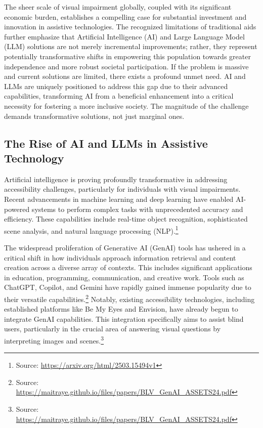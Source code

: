 The sheer scale of visual impairment globally, coupled with its significant economic burden, establishes a compelling case for substantial investment and innovation in assistive technologies. The recognized limitations of traditional aids further emphasize that Artificial Intelligence (AI) and Large Language Model (LLM) solutions are not merely incremental improvements; rather, they represent potentially transformative shifts in empowering this population towards greater independence and more robust societal participation. If the problem is massive and current solutions are limited, there exists a profound unmet need. AI and LLMs are uniquely positioned to address this gap due to their advanced capabilities, transforming AI from a beneficial enhancement into a critical necessity for fostering a more inclusive society. The magnitude of the challenge demands transformative solutions, not just marginal ones.

\subsection{The Rise of AI and LLMs in Assistive Technology}

Artificial intelligence is proving profoundly transformative in addressing accessibility challenges, particularly for individuals with visual impairments. Recent advancements in machine learning and deep learning have enabled AI-powered systems to perform complex tasks with unprecedented accuracy and efficiency. These capabilities include real-time object recognition, sophisticated scene analysis, and natural language processing (NLP).\footnote{Source: \url{https://arxiv.org/html/2503.15494v1}}

The widespread proliferation of Generative AI (GenAI) tools has ushered in a critical shift in how individuals approach information retrieval and content creation across a diverse array of contexts. This includes significant applications in education, programming, communication, and creative work. Tools such as ChatGPT, Copilot, and Gemini have rapidly gained immense popularity due to their versatile capabilities.\footnote{Source: \url{https://maitraye.github.io/files/papers/BLV_GenAI_ASSETS24.pdf}} Notably, existing accessibility technologies, including established platforms like Be My Eyes and Envision, have already begun to integrate GenAI capabilities. This integration specifically aims to assist blind users, particularly in the crucial area of answering visual questions by interpreting images and scenes.\footnote{Source: \url{https://maitraye.github.io/files/papers/BLV_GenAI_ASSETS24.pdf}}


